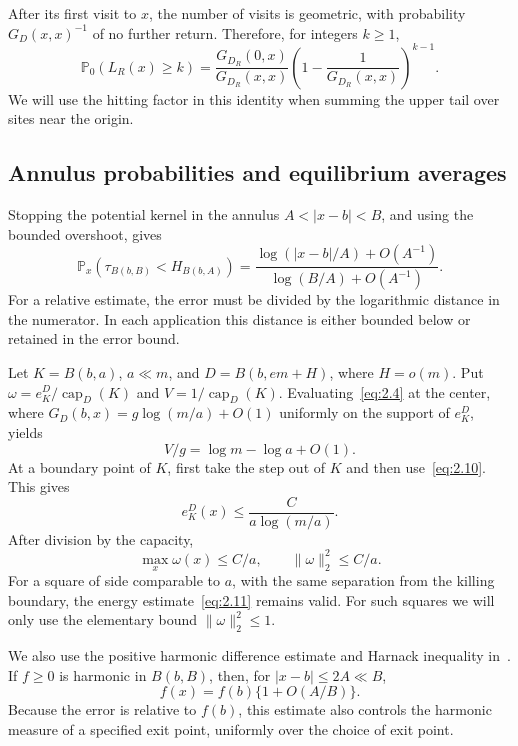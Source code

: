 \documentclass[11pt,letterpaper,reqno]{amsart}
\numberwithin{equation}{section}
\theoremstyle{remark}
\begin{document}
After its first visit to $x$, the number of visits is geometric, with probability $G_D(x,x)^{-1}$ of no further return. Therefore, for integers $k\ge1$,
\begin{equation}\label{eq:2.9}
\mathbb P_0(L_R(x)\ge k)=
\frac{G_{D_R}(0,x)}{G_{D_R}(x,x)}
\left(1-\frac1{G_{D_R}(x,x)}\right)^{k-1}.
\end{equation}
We will use the hitting factor in this identity when summing the upper tail over sites near the origin.

\subsection{Annulus probabilities and equilibrium averages}\label{sec:annuli}
Stopping the potential kernel in the annulus $A<|x-b|<B$, and using the bounded overshoot, gives
\begin{equation}\label{eq:2.10}
\mathbb P_x(\tau_{B(b,B)}<H_{B(b,A)})
=\frac{\log(|x-b|/A)+O(A^{-1})}
       {\log(B/A)+O(A^{-1})}.
\end{equation}
For a relative estimate, the error must be divided by the logarithmic distance in the numerator. In each application this distance is either bounded below or retained in the error bound.

Let $K=B(b,a)$, $a\ll m$, and $D=B(b,em+H)$, where $H=o(m)$. Put
$\omega=e_K^D/\operatorname{cap}_D(K)$ and $V=1/\operatorname{cap}_D(K)$.
Evaluating~\eqref{eq:2.4} at the center, where $G_D(b,x)=g\log(m/a)+O(1)$ uniformly on the support of $e_K^D$, yields
\begin{equation}\label{eq:2.11}
V/g=\log m-\log a+O(1).
\end{equation}
At a boundary point of $K$, first take the step out of $K$ and then use~\eqref{eq:2.10}. This gives
\[
e_K^D(x)\le\frac{C}{a\log(m/a)}.
\]
After division by the capacity,
\begin{equation}\label{eq:2.12}
\max_x\omega(x)\le C/a,\qquad \|\omega\|_2^2\le C/a.
\end{equation}
For a square of side comparable to $a$, with the same separation from the killing boundary, the energy estimate~\eqref{eq:2.11} remains valid. For such squares we will only use the elementary bound $\|\omega\|_2^2\le1$.

We also use the positive harmonic difference estimate and Harnack inequality in~\cite[Theorems 6.3.8(b) and 6.3.9]{LL}. If $f\ge0$ is harmonic in $B(b,B)$, then, for $|x-b|\le2A\ll B$,
\begin{equation}\label{eq:2.13}
f(x)=f(b)\{1+O(A/B)\}.
\end{equation}
Because the error is relative to $f(b)$, this estimate also controls the harmonic measure of a specified exit point, uniformly over the choice of exit point.
\end{document}

